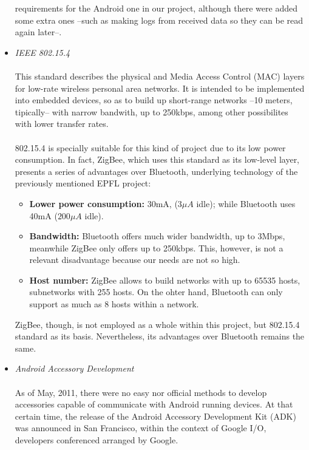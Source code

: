 \begin{itemize}
				requirements for the Android one in our project, although there were added some extra ones --such as
				making logs from received data so they can be read again later--.\\
			\item \emph{IEEE 802.15.4}\\\\
				This standard describes the physical and Media Access Control (MAC) layers for low-rate wireless
				personal area networks. It is intended to be implemented into embedded devices, so as to build up
				short-range networks --10 meters, tipically-- with narrow bandwith, up to 250kbps, among other
				possibilites with lower transfer rates.\\\\
				802.15.4 is specially suitable for this kind of project due to its low power consumption. In
				fact, ZigBee, which uses this standard as its low-level layer, presents a series of advantages
				over Bluetooth, underlying technology of the previously mentioned EPFL project:
				\begin{itemize}
					\item \textbf{Lower power consumption:} 30mA, ($3\mu A$ idle); while Bluetooth uses 40mA 
						($200\mu A$ idle).
					\item \textbf{Bandwidth:} Bluetooth offers much wider bandwidth, up to 3Mbps, meanwhile ZigBee 
						only offers up to 250kbps. This, however, is not a relevant disadvantage because our needs 
						are not so high.
					\item \textbf{Host number:} ZigBee allows to build networks with up to 65535 hosts, subnetworks 
						with 255 hosts. On the ohter hand, Bluetooth can only support as much as 8 hosts within a 
						network. 
				\end{itemize}
				ZigBee, though, is not employed as a whole within this project, but 802.15.4 standard as
				its basis. Nevertheless, its advantages over Bluetooth remains the same.\\
			\item \emph{Android Accessory Development}\\\\
				As of May, 2011, there were no easy nor official methods to develop
				accessories capable of communicate with Android running devices. At that
				certain time, the release of the Android Accessory Development Kit (ADK)
				was announced in San Francisco, within the context of Google I/O, developers
				conferenced arranged by Google.\\\\

\end{itemize}
